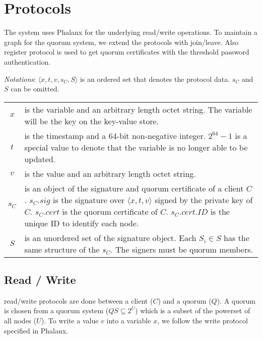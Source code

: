 \section{Protocols}
\label{Protocols}
The system uses Phalanx \cite{Delhi:2} for the underlying {\sf
read/write} operations. To maintain a graph for the quorum system, we
extend the protocols with {\sf join/leave}. Also {\sf register}
protocol is used to get quorum certificates with the threshold
password authentication.

{\em Notations}:
$\langle x, t, v, s_C, S \rangle$ is an ordered set that denotes the protocol
data. $s_C$ and $S$ can be omitted.

\begin{tabular}{cl}
  $x$ & \begin{minipage}[t]{0.8\columnwidth}%
    is the variable and an arbitrary length octet
    string. The variable will be the key on the key-value store.%
  \end{minipage}\\
  $t$ & \begin{minipage}[t]{0.8\columnwidth}%
    is the timestamp and a 64-bit non-negative
    integer. $2^{64}-1$ is a special value to denote that the variable is
    no longer able to be updated.%
  \end{minipage}\\
  $v$ & \begin{minipage}[t]{0.8\columnwidth}%
    is the value and an arbitrary length octet string.%
  \end{minipage}\\
  $s_C$ & \begin{minipage}[t]{0.8\columnwidth}%
    is an object of the signature and quorum certificate
    of a client $C$. $s_C.sig$ is the signature over $\langle x, t, v
    \rangle$ signed by the private key of $C$. $s_C.cert$ is the quorum
    certificate of $C$. $s_C.cert.ID$ is the unique ID to identify each
    node.%
  \end{minipage}\\
  $S$ & \begin{minipage}[t]{0.8\columnwidth}%
    is an unordered set of the signature object. Each $S_i
    \in S$ has the
    same structure of the $s_C$. The signers must be quorum members.%
  \end{minipage}\\
\end{tabular}

\subsection{Read / Write}
\label{rw}
{\sf read/write} protocols are done between a client ($C$) and a
quorum ($Q$). A quorum is chosen from a quorum system ($QS \subseteq
2^U$) which is a subset of the powerset of all nodes ($U$).  To write
a value $v$ into a variable $x$, we follow the write protocol
specified in Phalanx.\\

